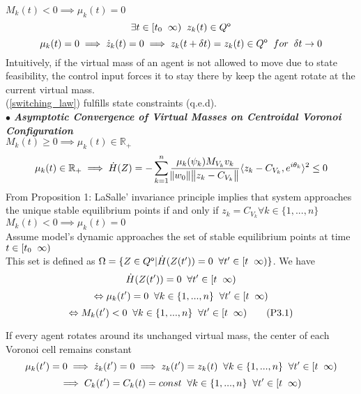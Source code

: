 \noindent \underline{${M_k(t) < 0  \implies \mu_k(t) = 0}$} 
\[\exists t \in [t_0 \txtspc{ } \infty) \txtspc{ } z_k(t) \in \interior{Q}\]
\[\mu_k(t) = 0 \implies \dot z_k(t) = 0 \implies z_k(t + \delta t) = z_k(t) \in \interior{Q} \txtspc{ } for \txtspc{ } \delta t \rightarrow 0\]
Intuitively, if the virtual mass of an agent is not allowed to move due to state feasibility, the control input forces it to stay there by keep the agent rotate at the current virtual mass. \\

\noindent (\ref{switching_law}) fulfills state constraints (q.e.d). \\

\noindent $\bullet$ \textbf{\textit{Asymptotic Convergence of Virtual Masses on Centroidal Voronoi Configuration}} \\
\noindent \underline{${M_k(t) \geq 0 \implies \mu_k(t) \in \mathbb{R}_+}$} \\
\[\mu_k(t) \in \mathbb{R}_+ \implies \dot H(Z) = - \displaystyle\sum_{k=1}^{n} \frac{\mu_k(\psi_{k})M_{V_{k}}v_{k}}{\norm{w_{0}}\norm{z_{k} - C_{V_{k}}}} \langle{z_{k} - C_{V_{k}},e^{i\theta_{k}}}\rangle^{2} \leq 0\] 
From Proposition 1: LaSalle' invariance principle implies that system approaches the unique stable equilibrium points if and only if ${z_{k} = C_{V_{k}} \forall k \in \{1,...,n\}}$ \\

\noindent \underline{${M_k(t) < 0  \implies \mu_k(t) = 0}$} \\
Assume model's dynamic approaches the set of stable equilibrium points at time ${t \in [t_0 \txtspc{ } \infty)}$ \\
This set is defined as ${\Omega = \{Z \in \interior Q| \dot H(Z(t')) = 0 \txtspc{ } \forall t' \in [t \txtspc{ } \infty)\}}$. We have
\[\dot H(Z(t')) = 0 \txtspc{ } \forall t' \in [t \txtspc{ } \infty)\]
\[\Leftrightarrow \mu_k(t') = 0 \txtspc{ } \forall k \in \{1,...,n\} \txtspc{ } \forall t' \in [t \txtspc{ } \infty) \]
\[\Leftrightarrow M_k(t') < 0 \txtspc{ } \forall k \in \{1,...,n\} \txtspc{ } \forall t' \in [t \txtspc{ } \infty) \tag{P3.1} \] 

\noindent If every agent rotates around its unchanged virtual mass, the center of each Voronoi cell remains constant \\
\[\mu_k(t') = 0 \implies \dot z_k(t') = 0 \implies z_k(t') = z_k(t) \txtspc{ } \forall k \in \{1,...,n\} \txtspc{ } \forall t' \in [t \txtspc{ } \infty)\]
\[\implies C_k(t') = C_k(t) = const  \txtspc{ } \forall k \in \{1,...,n\} \txtspc{ } \forall t' \in [t \txtspc{ } \infty)\]

